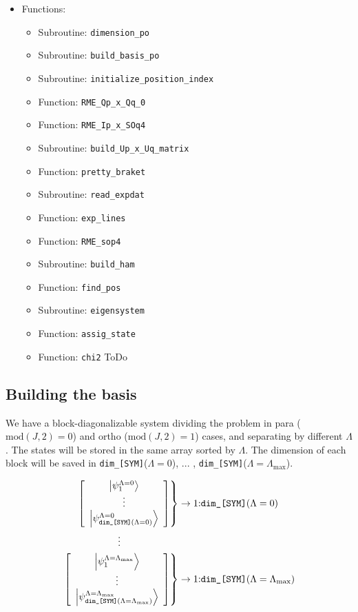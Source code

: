 \documentclass[english,twoside, openright]{report}
\begin{document}
\begin{itemize}
\begin{itemize}
  \end{itemize}
\item Functions:
  \begin{itemize}
  \item Subroutine: \texttt{dimension\_po}
  \item Subroutine: \texttt{build\_basis\_po}
  \item Subroutine: \texttt{initialize\_position\_index}
  \item Function: \texttt{RME\_Qp\_x\_Qq\_0}
  \item Function: \texttt{RME\_Ip\_x\_SOq4}
  \item Subroutine: \texttt{build\_Up\_x\_Uq\_matrix}
  \item Function: \texttt{pretty\_braket}
  \item Subroutine: \texttt{read\_expdat}
  \item Function: \texttt{exp\_lines}
  \item Function: \texttt{RME\_sop4}
  \item Subroutine: \texttt{build\_ham}
  \item Function: \texttt{find\_pos}
  \item Subroutine: \texttt{eigensystem}
  \item Function: \texttt{assig\_state}
  \item Function: \texttt{chi2} ToDo
  \end{itemize}
\end{itemize}

\subsection{Building the basis}

We have a block-diagonalizable system dividing the problem in para
($\text{mod}(J,2)=0$) and ortho ($\text{mod}(J,2)=1$) cases, and
separating by different $\Lambda$. The states will be stored in the
same array sorted by $\Lambda$. The dimension of each block will be
saved in \texttt{dim\_[SYM]}($\Lambda=0$), ... ,
\texttt{dim\_[SYM]}($\Lambda=\Lambda_{\text{max}}$).

\begin{align}
  \left.\left[
  \begin{array}{c}
    \ket{\psi_{1}^{\Lambda=0} }\\
    \vdots \\
    \ket{\psi_{\text{\texttt{dim\_[SYM]}}(\Lambda=0)}^{\Lambda=0}}
  \end{array}
  \right]\right\}& \rightarrow \text{1:\texttt{dim\_[SYM]}}(\Lambda=0)
  \nonumber\\
  \vdots  \qquad \qquad \qquad &
  \\
  \left.\left[
  \begin{array}{c}
    \ket{\psi_{1}^{\Lambda=\Lambda_{\text{max}}} }\\
    \vdots \\
    \ket{\psi_{\text{\texttt{dim\_[SYM]}}(\Lambda=\Lambda_{\text{max}})}^{\Lambda=\Lambda_{\text{max}}}}
  \end{array}
  \right]\right\}& \rightarrow \text{1:\texttt{dim\_[SYM]}}(\Lambda=\Lambda_{\text{max}}) \nonumber
\end{align}
\end{document}
